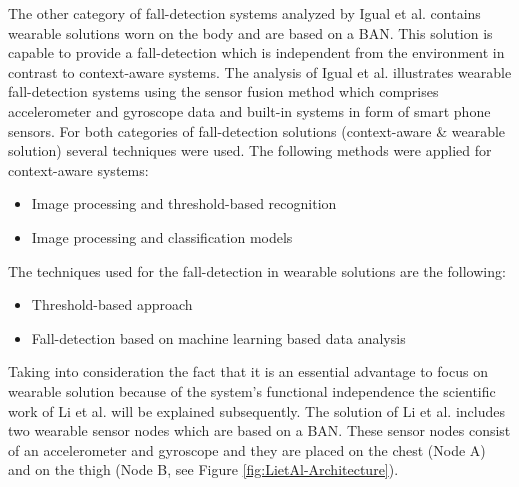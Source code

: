 \documentclass[review]{elsarticle}
\begin{document}
The other category of fall-detection systems analyzed by Igual et al. \cite{Igual2013} contains wearable solutions worn on the body and are based on a BAN. This solution is capable to provide a fall-detection which is independent from the environment in contrast to context-aware systems. The analysis of Igual et al. \cite{Igual2013} illustrates wearable fall-detection systems using the sensor fusion method which comprises accelerometer and gyroscope data and built-in systems in form of smart phone sensors. For both categories of fall-detection solutions (context-aware \& wearable solution) several techniques were used. The following methods were applied for context-aware systems:
\begin{itemize}
	\item Image processing and threshold-based recognition
	\item Image processing and classification models
\end{itemize}
The techniques used for the fall-detection in wearable solutions are the following:
\begin{itemize}
	\item Threshold-based approach
	\item Fall-detection based on machine learning based data analysis
\end{itemize}
Taking into consideration the fact that it is an essential advantage to focus on wearable solution because of the system's functional independence the scientific work of Li et al. \cite{Li2009} will be explained subsequently. The solution of Li et al. \cite{Li2009} includes two wearable sensor nodes which are based on a BAN. These sensor nodes consist of an accelerometer and gyroscope and they are placed on the chest (Node A) and on the thigh (Node B, see Figure \ref{fig:LietAl-Architecture}). 
\end{document}
